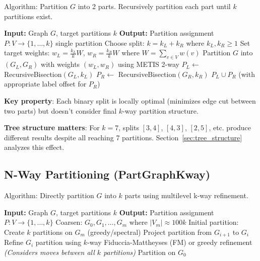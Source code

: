 Algorithm: Partition $G$ into 2 parts. Recursively partition each part until $k$ partitions exist.

\begin{algorithm}[H]
\caption{Recursive Bisection}
\begin{algorithmic}[1]
\STATE \textbf{Input:} Graph $G$, target partitions $k$
\STATE \textbf{Output:} Partition assignment $P: V \to \{1, \ldots, k\}$
\STATE
{}
    \RETURN single partition
\ENDIF
\STATE
\STATE Choose split: $k = k_L + k_R$ where $k_L, k_R \geq 1$
\STATE Set target weights: $w_L = \frac{k_L}{k}W$, $w_R = \frac{k_R}{k}W$ where $W = \sum_{v \in V} w(v)$
\STATE Partition $G$ into $(G_L, G_R)$ with weights $(w_L, w_R)$ using METIS 2-way
\STATE
\STATE $P_L \gets$ RecursiveBisection$(G_L, k_L)$
\STATE $P_R \gets$ RecursiveBisection$(G_R, k_R)$
\STATE
\RETURN $P_L \cup P_R$ (with appropriate label offset for $P_R$)
\end{algorithmic}
\end{algorithm}

\textbf{Key property}: Each binary split is locally optimal (minimizes edge cut between two parts) but doesn't consider final $k$-way partition structure.

\textbf{Tree structure matters}: For $k=7$, splits $[3,4]$, $[4,3]$, $[2,5]$, etc. produce different results despite all reaching 7 partitions. Section~\ref{sec:tree_structure} analyzes this effect.

\subsection{N-Way Partitioning (PartGraphKway)}

Algorithm: Directly partition $G$ into $k$ parts using multilevel k-way refinement.

\begin{algorithm}[H]
\caption{N-Way Partitioning}
\begin{algorithmic}[1]
\STATE \textbf{Input:} Graph $G$, target partitions $k$
\STATE \textbf{Output:} Partition assignment $P: V \to \{1, \ldots, k\}$
\STATE
\STATE Coarsen: $G_0, G_1, \ldots, G_m$ where $|V_m| \approx 100k$
\STATE Initial partition: Create $k$ partitions on $G_m$ (greedy/spectral)
\STATE
{}
    \STATE Project partition from $G_{i+1}$ to $G_i$
    \STATE Refine $G_i$ partition using $k$-way Fiduccia-Mattheyses (FM) or greedy refinement
    \STATE \quad \textit{(Considers moves between all $k$ partitions)}
\ENDFOR
\STATE
\RETURN Partition on $G_0$
\end{algorithmic}
\end{algorithm}

